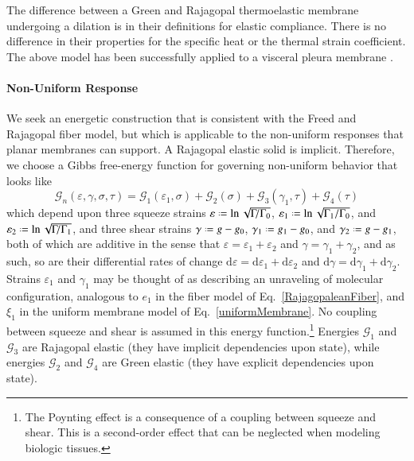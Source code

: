 The difference between a Green and Rajagopal thermo\-elastic membrane under\-going a dilation is in their definitions for elastic compliance.  There is no difference in their properties for the specific heat or the thermal strain coefficient.  The above model has been successfully applied to a visceral pleura membrane \cite{Freedetal17}.

\paragraph{Non-Uniform Response}

We seek an energetic construction that is consistent with the Freed and Rajagopal \cite{FreedRajagopal16} fiber model, but which is applicable to the non-uniform responses that planar membranes can support.  A Rajagopal elastic solid is implicit. Therefore, we choose a Gibbs free-energy function for governing non-uniform behavior that looks like
\begin{equation}
\mathcal{G}_n ( \varepsilon , \gamma , \sigma , \tau ) = \mathcal{G}_1 ( \varepsilon_1 , \sigma ) + \mathcal{G}_2 ( \sigma ) + \mathcal{G}_3 ( \gamma_1 , \tau ) + \mathcal{G}_4 ( \tau )
\label{nonuniformEnergy}
\end{equation}
which depend upon three squeeze strains $\varepsilon \defeq \ln \sqrt{\Gamma \! / \Gamma_0}$, $\varepsilon_1 \defeq \ln \sqrt{ \Gamma_1 / \Gamma_0}$, and $\varepsilon_2 \defeq \ln \sqrt{ \Gamma \! / \Gamma_1}$, and three shear strains $\gamma \defeq g - g_0$, $\gamma_1 \defeq g_1 - g_0$, and $\gamma_2 \defeq g - g_1$, both of which are additive in the sense that $\varepsilon = \varepsilon_1 + \varepsilon_2$ and $\gamma = \gamma_1 + \gamma_2$, and as such, so are their differential rates of change $\mathrm{d} \varepsilon = \mathrm{d} \varepsilon_1 + \mathrm{d} \varepsilon_2$ and $\mathrm{d} \gamma = \mathrm{d} \gamma_1 + \mathrm{d} \gamma_2$.  Strains $\varepsilon_1$ and $\gamma_1$ may be thought of as describing an unraveling of molecular configuration, analogous to $e_1$ in the fiber model of Eq.~\ref{RajagopaleanFiber}, and $\xi_1$ in the uniform membrane model of Eq.~\ref{uniformMembrane}.  No coupling between squeeze and shear is assumed in this energy function.\footnote{
    The Poynting effect is a consequence of a coupling between squeeze and shear. \cite{FreedZamani19}  This is a second-order effect that can be neglected when modeling biologic tissues.
}  
Energies $\mathcal{G}_1$ and $\mathcal{G}_3$ are Rajagopal elastic (they have implicit dependencies upon state), while energies $\mathcal{G}_2$ and $\mathcal{G}_4$ are Green elastic (they have explicit dependencies upon state).

